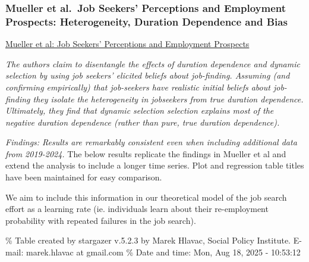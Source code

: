 \documentclass[
]{article}
\begin{document}
\subsubsection{Mueller et al.~Job Seekers' Perceptions and Employment
Prospects: Heterogeneity, Duration Dependence and
Bias}\label{mueller-et-al.-job-seekers-perceptions-and-employment-prospects-heterogeneity-duration-dependence-and-bias}

\href{https://www.aeaweb.org/articles?id=10.1257/aer.20190808}{Mueller
et al: Job Seekers' Perceptions and Employment Prospects}

\emph{The authors claim to disentangle the effects of duration
dependence and dynamic selection by using job seekers' elicited beliefs
about job-finding. Assuming (and confirming empirically) that
job-seekers have realistic initial beliefs about job-finding they
isolate the heterogeneity in jobseekers from true duration dependence.
Ultimately, they find that dynamic selection selection explains most of
the negative duration dependence (rather than pure, true duration
dependence).}

\emph{Findings: Results are remarkably consistent even when including
additional data from 2019-2024.} The below results replicate the
findings in Mueller et al and extend the analysis to include a longer
time series. Plot and regression table titles have been maintained for
easy comparison.

We aim to include this information in our theoretical model of the job
search effort as a learning rate (ie. individuals learn about their
re-employment probability with repeated failures in the job search).

\% Table created by stargazer v.5.2.3 by Marek Hlavac, Social Policy
Institute. E-mail: marek.hlavac at gmail.com \% Date and time: Mon, Aug
18, 2025 - 10:53:12
\end{document}
